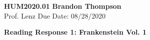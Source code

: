 \noindent
\textbf{HUM2020.01} \hfill \textbf{Brandon Thompson} \\
\normalsize Prof. Lenz \hfill Due Date: 08/28/2020 \\

\begin{center}
\textbf{Reading Response 1: Frankenstein Vol. 1}
\end{center}
